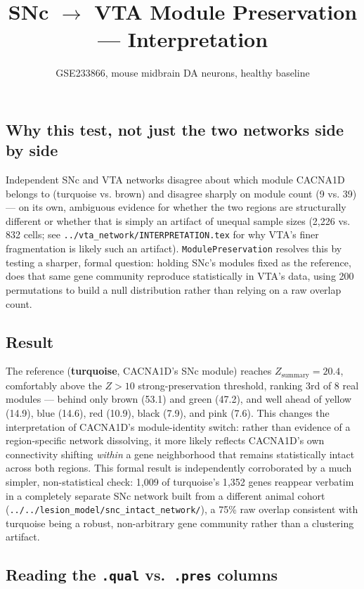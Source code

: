 \documentclass[11pt]{article}
\title{SNc $\to$ VTA Module Preservation --- Interpretation}
\author{GSE233866, mouse midbrain DA neurons, healthy baseline}
\date{}
\begin{document}
\maketitle

\subsection*{Why this test, not just the two networks side by side}

Independent SNc and VTA networks disagree about which module CACNA1D belongs
to (turquoise vs. brown) and disagree sharply on module count (9 vs. 39) ---
on its own, ambiguous evidence for whether the two regions are structurally
different or whether that is simply an artifact of unequal sample sizes
(2{,}226 vs. 832 cells; see \texttt{../vta\_network/INTERPRETATION.tex} for
why VTA's finer fragmentation is likely such an artifact).
\texttt{ModulePreservation} resolves this by testing a sharper, formal
question: holding SNc's modules fixed as the reference, does that same gene
community reproduce statistically in VTA's data, using 200 permutations to
build a null distribution rather than relying on a raw overlap count.

\subsection*{Result}

The reference (\textbf{turquoise}, CACNA1D's SNc module) reaches
$Z_{\text{summary}} = 20.4$, comfortably above the $Z>10$ strong-preservation
threshold, ranking 3rd of 8 real modules --- behind only brown (53.1) and
green (47.2), and well ahead of yellow (14.9), blue (14.6), red (10.9),
black (7.9), and pink (7.6). This changes the interpretation of CACNA1D's
module-identity switch: rather than evidence of a region-specific network
dissolving, it more likely reflects CACNA1D's own connectivity shifting
\emph{within} a gene neighborhood that remains statistically intact across
both regions. This formal result is independently corroborated by a much
simpler, non-statistical check: 1{,}009 of turquoise's 1{,}352 genes reappear
verbatim in a completely separate SNc network built from a different animal
cohort (\texttt{../../lesion\_model/snc\_intact\_network/}), a 75\% raw
overlap consistent with turquoise being a robust, non-arbitrary gene
community rather than a clustering artifact.

\subsection*{Reading the \texttt{.qual} vs.\ \texttt{.pres} columns}
\end{document}
